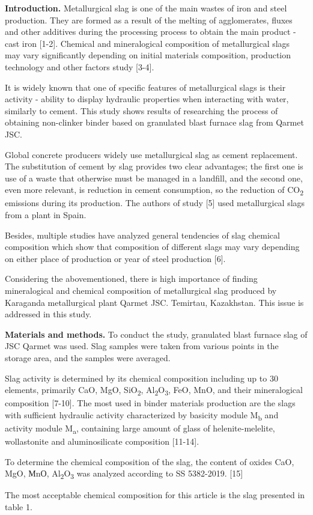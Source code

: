 \begin{multicols}{2}
{\bfseries Introduction.} Metallurgical slag is one of the main wastes of
iron and steel production. They are formed as a result of the melting of
agglomerates, fluxes and other additives during the processing process
to obtain the main product - cast iron {[}1-2{]}. Chemical and
mineralogical composition of metallurgical slags may vary significantly
depending on initial materials\textquotesingle{} composition, production
technology and other factors study {[}3-4{]}.

It is widely known that one of specific features of metallurgical slags
is their activity - ability to display hydraulic properties when
interacting with water, similarly to cement. This study shows results of
researching the process of obtaining non-clinker binder based on
granulated blast furnace slag from Qarmet JSC.

Global concrete producers widely use metallurgical slag as cement
replacement. The substitution of cement by slag provides two clear
advantages; the first one is use of a waste that otherwise must be
managed in a landfill, and the second one, even more relevant, is
reduction in cement consumption, so the reduction of CO\textsubscript{2}
emissions during its production. The authors of study {[}5{]} used
metallurgical slags from a plant in Spain.

Besides, multiple studies have analyzed general tendencies of slag
chemical composition which show that composition of different slags may
vary depending on either place of production or year of steel production
{[}6{]}.

Considering the abovementioned, there is high importance of finding
mineralogical and chemical composition of metallurgical slag produced by
Karaganda metallurgical plant Qarmet JSC. Temirtau, Kazakhstan. This
issue is addressed in this study.

{\bfseries Materials and methods.} To conduct the study, granulated blast
furnace slag of JSC Qarmet was used. Slag samples were taken from
various points in the storage area, and the samples were averaged.

Slag activity is determined by its chemical composition including up to
30 elements, primarily CaO, MgO, SiO\textsubscript{2},
Al\textsubscript{2}O\textsubscript{3}, FeO, MnO, and their mineralogical
composition {[}7-10{]}. The most used in binder materials production are
the slags with sufficient hydraulic activity characterized by basicity
module M\textsubscript{b} and activity module M\textsubscript{a},
containing large amount of glass of helenite-melelite, wollastonite and
aluminosilicate composition {[}11-14{]}.

To determine the chemical composition of the slag, the content of oxides
CaO, MgO, МnО, Al\textsubscript{2}O\textsubscript{3} was analyzed
according to SS 5382-2019. {[}15{]}

The most acceptable chemical composition for this article is the slag
presented in table 1.
\end{multicols}

